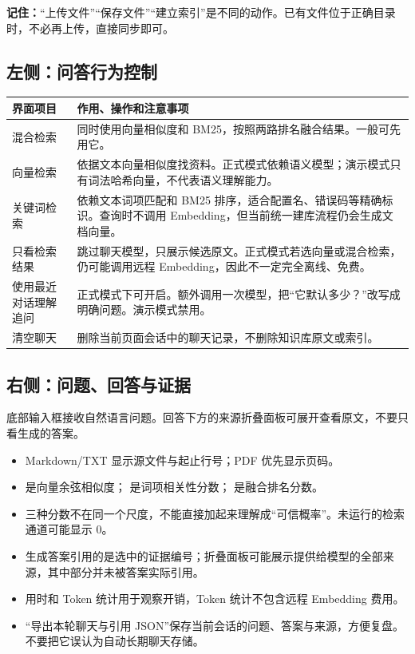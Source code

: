 \documentclass[UTF8,11pt,a4paper,fontset=fandol]{ctexart}
\newcommand{\code}[1]{\texttt{\detokenize{#1}}}
\newcommand{\important}[1]{\par\smallskip\noindent\textbf{记住：}#1\par\smallskip}
\begin{document}
\important{“上传文件”“保存文件”“建立索引”是不同的动作。已有文件位于正确目录时，不必再上传，直接同步即可。}

\subsection{左侧：问答行为控制}
\begin{longtable}{L{0.28\textwidth}L{0.60\textwidth}}
\toprule
界面项目 & 作用、操作和注意事项 \\
\midrule
混合检索 & 同时使用向量相似度和 BM25，按照两路排名融合结果。一般可先用它。 \\
向量检索 & 依据文本向量相似度找资料。正式模式依赖语义模型；演示模式只有词法哈希向量，不代表语义理解能力。 \\
关键词检索 & 依赖文本词项匹配和 BM25 排序，适合配置名、错误码等精确标识。查询时不调用 Embedding，但当前统一建库流程仍会生成文档向量。 \\
只看检索结果 & 跳过聊天模型，只展示候选原文。正式模式若选向量或混合检索，仍可能调用远程 Embedding，因此不一定完全离线、免费。 \\
使用最近对话理解追问 & 正式模式下可开启。额外调用一次模型，把“它默认多少？”改写成明确问题。演示模式禁用。 \\
清空聊天 & 删除当前页面会话中的聊天记录，不删除知识库原文或索引。 \\
\bottomrule
\end{longtable}

\subsection{右侧：问题、回答与证据}
底部输入框接收自然语言问题。回答下方的来源折叠面板可展开查看原文，不要只看生成的答案。

\begin{itemize}
\item Markdown/TXT 显示源文件与起止行号；PDF 优先显示页码。
\item \code{cosine} 是向量余弦相似度；\code{BM25} 是词项相关性分数；\code{RRF} 是融合排名分数。
\item 三种分数不在同一个尺度，不能直接加起来理解成“可信概率”。未运行的检索通道可能显示 0。
\item 生成答案引用的是选中的证据编号；折叠面板可能展示提供给模型的全部来源，其中部分并未被答案实际引用。
\item 用时和 Token 统计用于观察开销，Token 统计不包含远程 Embedding 费用。
\item “导出本轮聊天与引用 JSON”保存当前会话的问题、答案与来源，方便复盘。不要把它误认为自动长期聊天存储。
\end{itemize}
\end{document}
